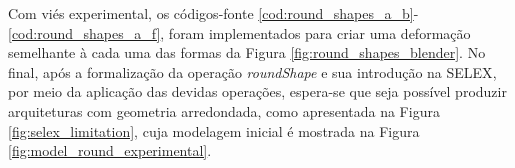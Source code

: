 \begin{figure}[h!]
	\centering
	\captionsetup{width=15cm}
	{}	
\end{figure}

Com viés experimental, os códigos-fonte \ref{cod:round_shapes_a_b}-\ref{cod:round_shapes_a_f}, foram implementados para criar uma deformação semelhante à cada uma das formas da Figura \ref{fig:round_shapes_blender}. No final, após a formalização da operação \textit{roundShape} e sua introdução na \gls{SELEX}, por meio da aplicação das devidas operações, espera-se que seja possível produzir arquiteturas com geometria arredondada, como apresentada na Figura \ref{fig:selex_limitation}, cuja modelagem inicial é mostrada na Figura \ref{fig:model_round_experimental}.

\begin{figure}[h!]
	\centering
	\captionsetup{width=15cm}
	{}	
\end{figure}

